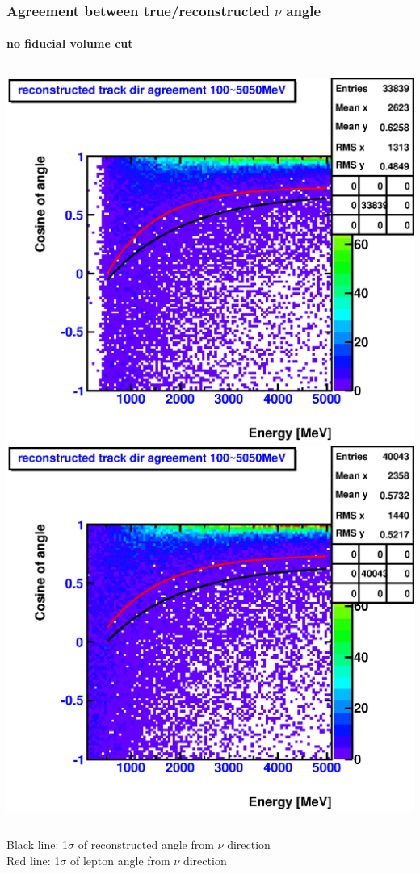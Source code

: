 \documentclass{beamer}
\begin{document}
\begin{frame}
	\frametitle{Agreement between true/reconstructed $\nu$ angle}
	\framesubtitle{no fiducial volume cut}
	\begin{columns}[T]
		\includegraphics[width=1.0\textwidth]{analyzed_mtq_flatSpectrum_nue_H1_outerBufferFillAll_reconDirAgreementWithMtqTruthVectorVSEnergy_onlyCC.eps}
		\includegraphics[width=1.0\textwidth]{analyzed_mtq_flatSpectrum_nue_C12_outerBufferFillAll_reconDirAgreementWithMtqTruthVectorVSEnergy_onlyCC.eps}
	\end{columns}
	Black line: 1$\sigma$ of reconstructed angle from $\nu$ direction \\
	Red line: 1$\sigma$ of lepton angle from $\nu$ direction
\end{frame}
\end{document}
